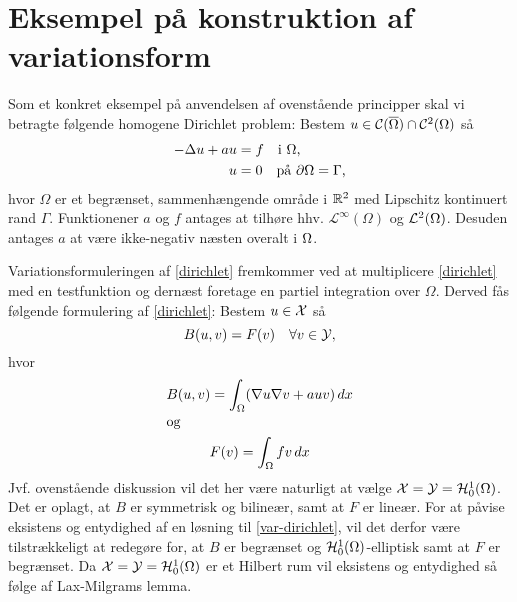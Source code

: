 \section{Eksempel på konstruktion af variationsform}
\begin{example}
Som et konkret eksempel på anvendelsen af ovenstående principper skal
vi betragte følgende homogene Dirichlet problem: Bestem
$u\in{\mathcal{C}}(\overline{\Omega})\cap{\mathcal{C}}^2(\Omega)$ så
\begin{align} \label{dirichlet}
  -\Delta u+au &= f \quad \text{i $\Omega$,} \\
             u &= 0 \quad \text{på $\partial\Omega=\Gamma$,} \notag
\end{align}
hvor $\Omega$ er et begrænset, sammenhængende område i $\mathbb{R}^2$ med
Lipschitz kontinuert rand $\Gamma$. Funktionener $a$ og $f$ antages at
tilhøre hhv. ${\mathcal L}^\infty(\Omega)$ og ${\mathcal L}^2(\Omega)$. Desuden antages
$a$ at være ikke-negativ næsten overalt i $\Omega$. 

Variationsformuleringen af \eqref{dirichlet} fremkommer ved at
multiplicere \eqref{dirichlet} med en testfunktion og dernæst foretage
en partiel integration over $\Omega$. Derved fås følgende formulering
af \eqref{dirichlet}: Bestem $u\in\mathcal{X}$ så
\begin{equation} \label{var-dirichlet}
  B(u,v) = F(v) \quad \forall v\in\mathcal{Y} ,
\end{equation}
hvor 
\begin{gather}
  B(u,v)= \int_\Omega (\nabla u\nabla v +auv)\, dx \\
  \intertext{og}
  F(v) = \int_\Omega fv\, dx
\end{gather}
Jvf. ovenstående diskussion vil det her være naturligt at vælge 
$\mathcal{X} =\mathcal{Y} =\mathcal H^1_0(\Omega)$. Det er oplagt, at $B$ er symmetrisk og
bilineær, samt at $F$ er lineær. For at påvise eksistens og entydighed
af en løsning til \eqref{var-dirichlet}, vil det derfor være tilstrækkeligt at redegøre
for, at $B$ er begrænset og $\mathcal H^1_0(\Omega)$-elliptisk samt at $F$
er begrænset. Da $\mathcal{X} =\mathcal{Y} =\mathcal H^1_0(\Omega)$ er et Hilbert rum vil
eksistens og entydighed så følge af Lax-Milgrams lemma.


\end{example}
